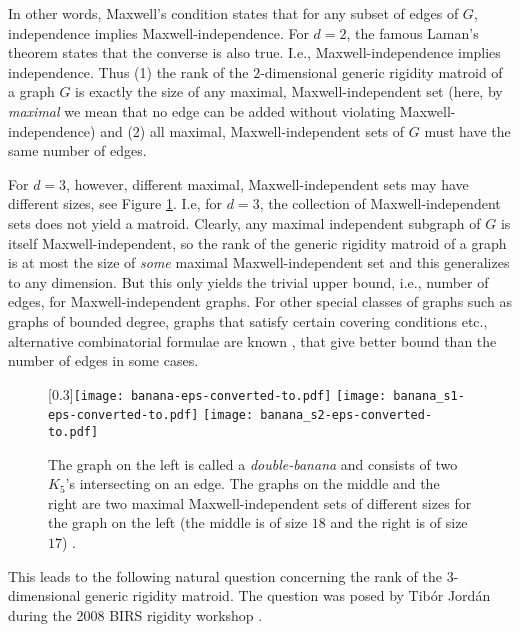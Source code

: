 \documentclass[10pt]{article}
\begin{document}
\medskip\noindent
In other words, Maxwell's condition states that for any subset of edges of
$G$, independence implies Maxwell-independence. For $d=2$, the famous Laman's theorem states that the converse is also true. I.e., Maxwell-independence implies independence.
Thus (1) the rank of the $2$-dimensional generic rigidity matroid of a graph $G$ is exactly the size of any maximal, Maxwell-independent set (here, by {\em maximal} we mean that no edge can be added without violating Maxwell-independence) and (2) all maximal, Maxwell-independent sets of $G$ must have the same number of edges.

\medskip\noindent
For $d=3$, however, different maximal, Maxwell-independent sets may
have different sizes, see Figure \ref{fig:banana}.
I.e, for $d=3$, the collection of Maxwell-independent sets does
not yield a matroid.
Clearly, any maximal independent subgraph of $G$
is itself Maxwell-independent, so the rank of the generic rigidity matroid of a
graph is at most the
size of {\em some} maximal Maxwell-independent set and this
generalizes to any dimension.
But this only yields the trivial upper bound, i.e., number of edges, for Maxwell-independent graphs.
For other special classes of graphs such as graphs of
bounded degree, graphs that satisfy certain covering conditions
etc., alternative combinatorial formulae are known \cite{JacksonJordanrank:2006, JacksonJordansparse:2005}, that give better bound than the number of edges in some cases.

\begin{center}
\begin{figure}[!h]
\begin{center}
\scalebox{0.3}[0.3]{\texttt{[image: banana-eps-converted-to.pdf]} \texttt{[image: banana\_s1-eps-converted-to.pdf]} \texttt{[image: banana\_s2-eps-converted-to.pdf]}}
\end{center}
\caption{The graph on the left is called a {\em double-banana} and consists of two $K_5$'s intersecting on an edge. The graphs on the middle and the right are two maximal Maxwell-independent sets of different sizes for the graph on the left (the middle is of size $18$ and the right is of size $17$)
.}\label{fig:banana}
\end{figure}
\end{center}
\medskip
\noindent
This leads to the following natural question concerning the rank of the $3$-dimensional generic rigidity matroid. The question was posed by Tib\'or Jord\'an during the 2008 BIRS rigidity workshop \cite{bib:birs}.
\end{document}

